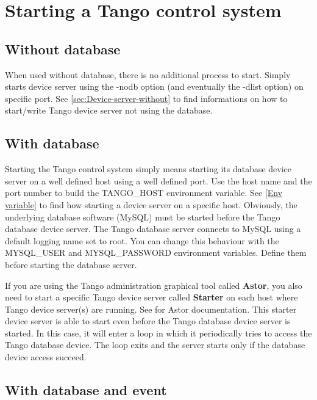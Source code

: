 
\chapter{Starting a Tango control system}

\section{Without database}

When used without database, there is no additional
process to start. Simply starts device server using the -nodb option
(and eventually the -dlist option) on specific port. See \ref{sec:Device-server-without}
to find informations on how to start/write Tango device server not
using the database.

\section{With database}

Starting the Tango control system simply means starting its database
device server on a well defined host using a well defined port. Use
the host name and the port number to build the TANGO\_HOST environment
variable. See \ref{Env variable} to find how starting a device server
on a specific host. Obviously, the underlying database software (MySQL)
must be started before the Tango database device server. The Tango
database server connects to MySQL using a default logging name set
to \textquotedbl{}root\textquotedbl{}. You can change this behaviour
with the MYSQL\_USER and MYSQL\_PASSWORD
environment variables. Define them before starting the database server.

If you are using the Tango administration graphical tool called \textbf{Astor},
you also need to start a specific Tango device server called \textbf{Starter}
on each host where Tango device server(s) are running. See \cite{Astor_doc}
for Astor documentation. This starter device server is able to start
even before the Tango database device server is started. In this case,
it will enter a loop in which it periodically tries to access the
Tango database device. The loop exits and the server starts only if
the database device access succeed.

\section{With database and event}

